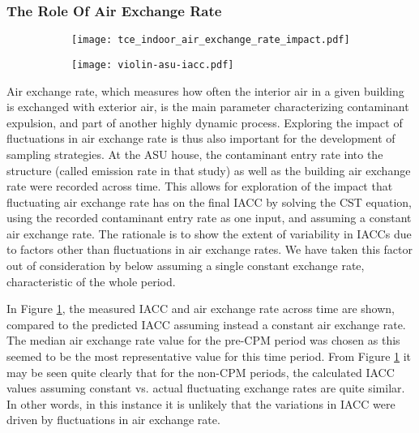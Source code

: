 \documentclass[journal=esthag,manuscript=article]{achemso}
\begin{document}
\subsubsection{The Role Of Air Exchange Rate}
\begin{figure}[htb!]
  \caption{Comparison between the recorded  and the calculated TCE in indoor air at the ASU house, assuming constant air exchange rate. \ref{fig:asu-iacc-ae-overview} shows the TCE in indoor air across time as well as the exchange rate. \ref{fig:violin-iacc-aet} shows the distribution of these values for three periods.}
  \label{fig:ae-analysis}
  \begin{subfigure}{\textwidth}
    \caption{ }
    \label{fig:asu-iacc-ae-overview}
    \texttt{[image: tce\_indoor\_air\_exchange\_rate\_impact.pdf]}
  \end{subfigure}
  \begin{subfigure}{0.75\textwidth}
    \caption{ }
    \label{fig:violin-iacc-aet}
    \texttt{[image: violin-asu-iacc.pdf]}
  \end{subfigure}
\end{figure}
Air exchange rate, which measures how often the interior air in a given building is exchanged with exterior air, is the main parameter characterizing contaminant expulsion, and part of another highly dynamic process.
Exploring the impact of fluctuations in air exchange rate is thus also important for the development of sampling strategies.
At the ASU house, the contaminant entry rate into the structure (called emission rate in that study) as well as the building air exchange rate were recorded across time.
This allows for exploration of the impact that fluctuating air exchange rate has on the final IACC by solving the CST equation, using the recorded contaminant entry rate as one input, and assuming a constant air exchange rate.
The rationale is to show the extent of variability in IACCs due to factors other than fluctuations in air exchange rates.
We have taken this factor out of consideration by below assuming a single constant exchange rate, characteristic of the whole period.

In Figure \ref{fig:asu-iacc-ae-overview}, the measured IACC and air exchange rate across time are shown, compared to the predicted IACC assuming instead a constant air exchange rate.
The median air exchange rate value for the pre-CPM period was chosen as this seemed to be the most representative value for this time period.
From Figure \ref{fig:asu-iacc-ae-overview} it may be seen quite clearly that for the non-CPM periods, the calculated IACC values assuming constant vs. actual fluctuating exchange rates are quite similar.
In other words, in this instance it is unlikely that the variations in IACC were driven by fluctuations in air exchange rate.
\end{document}
